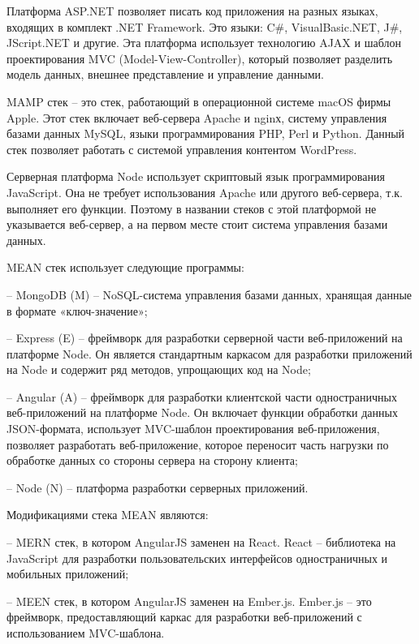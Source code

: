 Платформа ASP.NET позволяет писать код приложения на разных языках, входящих в комплект .NET Framework.
Это языки: C\#, VisualBasic.NET, J\#, JScript.NET и другие.
Эта платформа использует технологию AJAX и шаблон проектирования MVC (Model-View-Controller), который позволяет разделить модель данных, внешнее представление и управление данными.


MAMP стек – это стек, работающий в операционной системе macOS фирмы Apple.
Этот стек включает веб-сервера Apache и nginх, систему управления базами данных MySQL, языки программирования PHP, Perl и Python.
Данный стек позволяет работать с системой управления контентом WordPress.

Серверная платформа Node \cite{davidovsky-vibor-NODE} использует скриптовый язык программирования JavaScript.
Она не требует использования Apache или другого веб-сервера, т.к. выполняет его функции.
Поэтому в названии стеков с этой платформой не указывается веб-сервер, а на первом месте стоит система управления базами данных.


MEAN стек \cite{davidovsky-vibor-mean} использует следующие программы:

-- MongoDB (M) -- NoSQL-система управления базами данных, хранящая данные в формате «ключ-значение»;

-- Express (E) -- фреймворк для разработки серверной части веб-приложений на платформе Node.
Он является стандартным каркасом для разработки приложений на Node и содержит ряд методов, упрощающих код на Node;

-- Angular (A) -- фреймворк для разработки клиентской части одностраничных веб-приложений на платформе Node.
Он включает функции обработки данных JSON-формата, использует MVC-шаблон проектирования веб-приложения, позволяет разработать веб-приложение, которое переносит часть нагрузки по обработке данных со стороны сервера на сторону клиента;

-- Node (N) -- платформа разработки серверных приложений.

Модификациями стека MEAN являются:

-- MERN стек, в котором AngularJS заменен на React.
React -- библиотека на JavaScript для разработки пользовательских интерфейсов одностраничных и мобильных приложений;

-- MEEN стек, в котором AngularJS заменен на Ember.js.
Ember.js -- это фреймворк, предоставляющий каркас для разработки веб-приложений с использованием MVC-шаблона.

